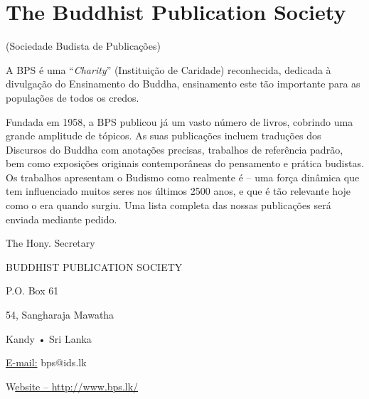 \chapter{The Buddhist Publication Society}

(Sociedade Budista de Publicações)

A BPS é uma ``\emph{Charity}'' (Instituição de Caridade) reconhecida, dedicada à divulgação do Ensinamento do Buddha, ensinamento este tão importante para as populações de todos os credos.

Fundada em 1958, a BPS publicou já um vasto número de livros, cobrindo uma grande amplitude de tópicos. As suas publicações incluem traduções dos Discursos do Buddha com anotações precisas, trabalhos de referência padrão, bem como exposições originais contemporâneas do pensamento e prática budistas. Os trabalhos apresentam o Budismo como realmente é -- uma força dinâmica que tem influenciado muitos seres nos últimos 2500 anos, e que é tão relevante hoje como o era quando surgiu. Uma lista completa das nossas publicações será enviada mediante pedido.

The Hony. Secretary

BUDDHIST PUBLICATION SOCIETY

P.O. Box 61

54, Sangharaja Mawatha

Kandy • Sri Lanka

\href{mailto:bps@ids.lk}{E-mail:} bps@ids.lk

W\href{http://www.bps.lk/}{ebsite -- http://www.bps.lk/}
